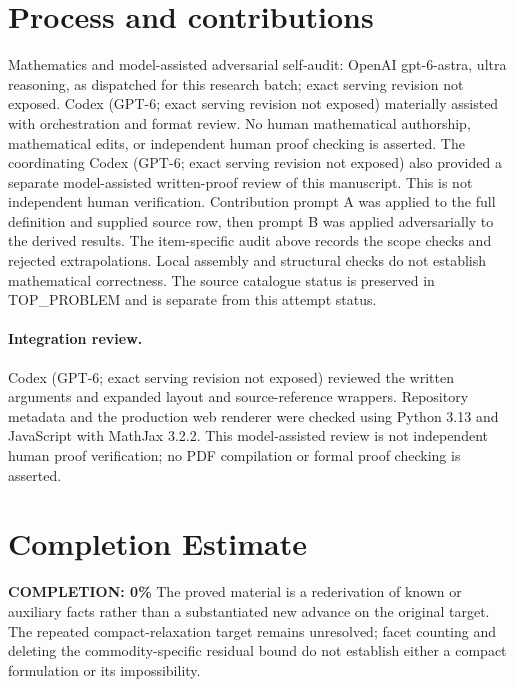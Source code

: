\documentclass[11pt]{article}
\begin{document}
\section{Process and contributions}
Mathematics and model-assisted adversarial self-audit: OpenAI gpt-6-astra, ultra reasoning, as dispatched for this research batch; exact serving revision not exposed. Codex (GPT-6; exact serving revision not exposed) materially assisted with orchestration and format review. No human mathematical authorship, mathematical edits, or independent human proof checking is asserted.
The coordinating Codex (GPT-6; exact serving revision not exposed) also provided a separate model-assisted written-proof review of this manuscript. This is not independent human verification.
Contribution prompt A was applied to the full definition and supplied source row, then prompt B was applied adversarially to the derived results. The item-specific audit above records the scope checks and rejected extrapolations. Local assembly and structural checks do not establish mathematical correctness. The source catalogue status is preserved in TOP\_PROBLEM and is separate from this attempt status.
\paragraph{Integration review.} Codex (GPT-6; exact serving revision not exposed) reviewed the written arguments and expanded layout and source-reference wrappers. Repository metadata and the production web renderer were checked using Python 3.13 and JavaScript with MathJax 3.2.2. This model-assisted review is not independent human proof verification; no PDF compilation or formal proof checking is asserted.

\section{Completion Estimate}
\noindent\textbf{COMPLETION: 0\%}
The proved material is a rederivation of known or auxiliary facts rather than a substantiated new advance on the original target. The repeated compact-relaxation target remains unresolved; facet counting and deleting the commodity-specific residual bound do not establish either a compact formulation or its impossibility.
\end{document}
